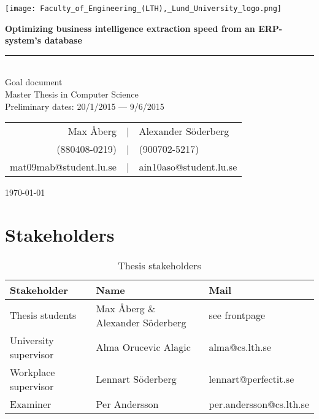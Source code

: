 \documentclass[12pt,a4paper]{article}
\newcommand{\HRule}{\rule{\linewidth}{0.5mm}}
\begin{document}
	\begin{titlepage}
  	\vspace*{3\baselineskip}
    \begin{center}
    	\begin{center}
    \texttt{[image: Faculty\_of\_Engineering\_(LTH),\_Lund\_University\_logo.png]}
    	\end{center}
    \vspace*{3\baselineskip}
    \large
    \bfseries
   \Huge
   Optimizing business intelligence extraction speed from an ERP-system's database
   \HRule\\
       \normalfont
          \LARGE
          Goal document \\
            \normalsize
            \vspace*{1\baselineskip}
      Master Thesis in  Computer Science\\
      \vspace*{4\baselineskip}
      Preliminary dates: 20/1/2015 --- 9/6/2015\\
      \vspace*{4\baselineskip}
      
      
      \begin{table}[H]
      \centering
      \begin{tabular}{r c l}
      Max Åberg &|& Alexander Söderberg\\
      (880408-0219) &|& (900702-5217) \\
      mat09mab@student.lu.se &|& ain10aso@student.lu.se\\
      \end{tabular}
      \end{table}

    
    

    \today \\

    \end{center}
\end{titlepage}
    
\newpage

\vspace*{-2\baselineskip}

\section*{Stakeholders}
\begin{table}[H]
    \begin{tabular}{l|l|l}
    Stakeholder & Name & Mail \\\hline
    Thesis students & Max Åberg \& Alexander Söderberg & see frontpage \\\hline
    University supervisor & Alma Orucevic Alagic & alma@cs.lth.se\\\hline
    Workplace supervisor & Lennart Söderberg & lennart@perfectit.se\\\hline
    Examiner & Per Andersson & per.andersson@cs.lth.se 
    \end{tabular}
    \caption{Thesis stakeholders}
\end{table}
\end{document}
